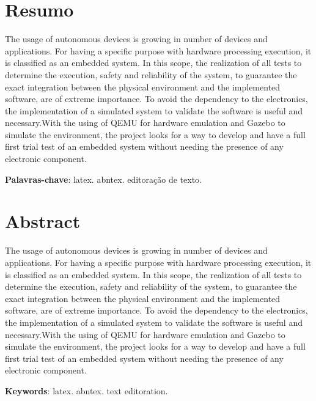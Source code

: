\documentclass[../monografia.tex]{subfiles}
\begin{document}
    \clearpage

    {\centering   
        \chapter*{Resumo}
    }
     The usage of autonomous devices is growing in number of devices and applications. For having a specific purpose with hardware processing execution, it is classified as an embedded system. In this scope, the realization of all tests to determine the execution, safety and reliability of the system, to guarantee the exact integration between the physical environment  and the implemented software, are of extreme importance. To avoid the dependency to the electronics, the implementation of a simulated system to validate the software is useful and necessary.With the using of QEMU for hardware emulation and Gazebo to simulate the environment, the project looks for a way to develop and have a full first trial test of an embedded system without needing the presence of any electronic component.
    
     \textbf{Palavras-chave}: latex. abntex. editoração de texto.
        
    \clearpage
    
    \begin{minipage}{\textwidth}
        {\centering   
        \chapter*{Abstract}
        }
        \hspace{1cm} The usage of autonomous devices is growing in number of devices and applications. For having a specific purpose with hardware processing execution, it is classified as an embedded system. In this scope, the realization of all tests to determine the execution, safety and reliability of the system, to guarantee the exact integration between the physical environment  and the implemented software, are of extreme importance. To avoid the dependency to the electronics, the implementation of a simulated system to validate the software is useful and necessary.With the using of QEMU for hardware emulation and Gazebo to simulate the environment, the project looks for a way to develop and have a full first trial test of an embedded system without needing the presence of any electronic component.
    
       \vspace{\onelineskip}
     
       \noindent 
       \textbf{Keywords}: latex. abntex. text editoration.
    \end{minipage}
\end{document}
